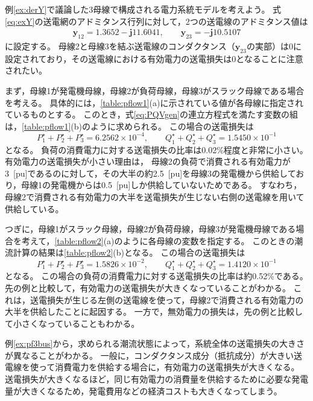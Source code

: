 \documentclass[tombow,dvipdfmx]{corona-a5-1.1}
\begin{document}
\begin{例}[データシートに基づく潮流計算]\label{ex:pf3bus}
例\ref{ex:derY}で議論した3母線で構成される電力系統モデルを考えよう。
式\ref{eq:exY}の送電網のアドミタンス行列に対して，2つの送電線のアドミタンス値は
\begin{align}\label{eq:rightlossless}
\bm{y}_{12} = 1.3652 - \bm{j} 11.6041, \qquad
\bm{y}_{23} =  - \bm{j} 10.5107
\end{align}
に設定する。
母線2と母線3を結ぶ送電線のコンダクタンス（$\bm{y}_{23}$の実部）は0に設定されており，その送電線における有効電力の送電損失は0となることに注意されたい。

まず，母線1が発電機母線，母線2が負荷母線，母線3がスラック母線である場合を考える。
具体的には，\ref{table:pflow1}(a)に示されている値が各母線に指定されているものとする。
このとき，式\ref{eq:PQVgen}の連立方程式を満たす変数の組は，\ref{table:pflow1}(b)のように求められる。
この場合の送電損失は
\[
P_1^{\star} + P_2^{\star} + P_3^{\star} = 6.2562\times 10^{-4},
\qquad 
Q_1^{\star} + Q_2^{\star} + Q_3^{\star} =1.5450  \times 10^{-1}
\]
となる。
負荷の消費電力に対する送電損失の比率は0.02\%程度と非常に小さい。
有効電力の送電損失が小さい理由は，
母線2の負荷で消費される有効電力が3~[pu]であるのに対して，その大半の約2.5~[pu]を母線3の発電機から供給しており，母線1の発電機からは0.5~[pu]しか供給していないためである。
すなわち，母線2で消費される有効電力の大半を送電損失が生じない右側の送電線を用いて供給している。

つぎに，母線1がスラック母線，母線2が負荷母線，母線3が発電機母線である場合を考えて，\ref{table:pflow2}(a)のように各母線の変数を指定する。
このときの潮流計算の結果は\ref{table:pflow2}(b)となる。
この場合の送電損失は
\[
P_1^{\star} + P_2^{\star} + P_3^{\star} = 1.5826 \times 10^{-2},
\qquad 
Q_1^{\star} + Q_2^{\star} + Q_3^{\star} =1.4120  \times 10^{-1}
\]
となる。
この場合の負荷の消費電力に対する送電損失の比率は約0.52\%である。
先の例と比較して，有効電力の送電損失が大きくなっていることがわかる。
これは，送電損失が生じる左側の送電線を使って，母線2で消費される有効電力の大半を供給したことに起因する。
一方で，無効電力の損失は，先の例と比較して小さくなっていることもわかる。
\end{例}

例\ref{ex:pf3bus}から，求められる潮流状態によって，系統全体の送電損失の大きさが異なることがわかる。
一般に，コンダクタンス成分（抵抗成分）が大きい送電線を使って消費電力を供給する場合に，有効電力の送電損失が大きくなる。
送電損失が大きくなるほど，同じ有効電力の消費量を供給するために必要な発電量が大きくなるため，発電費用などの経済コストも大きくなってしまう。
\end{document}
